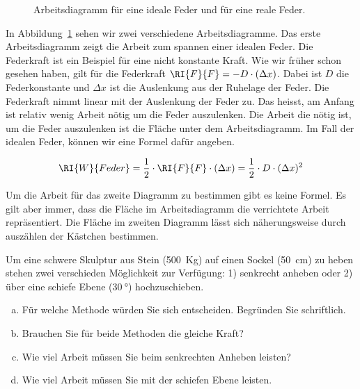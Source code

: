 \documentclass[12pt,a4paper,twoside]{article}
\def\dir{./Aufgaben_Mechanik/}
\newcommand{\Einbinden}[1]{}
\begin{document}
\begin{figure}[h!]
\begin{center}

\end{center}
\caption{\label{fig:arbeitsdiagramm} Arbeitsdiagramm für eine ideale Feder und für eine reale Feder.
}
\end{figure}

In Abbildung~\ref{fig:arbeitsdiagramm} sehen wir zwei verschiedene Arbeitsdiagramme. 
Das erste Arbeitsdiagramm zeigt die Arbeit zum spannen einer idealen Feder.
Die Federkraft ist ein Beispiel für eine nicht konstante Kraft. Wie wir früher schon
gesehen haben, gilt für die Federkraft $\RI{F}{F} = -D\cdot (\Delta x)$. Dabei ist $D$ die Federkonstante
und $\Delta x$ ist die Auslenkung aus der Ruhelage der Feder.
Die Federkraft nimmt linear mit der Auslenkung der Feder zu. Das heisst, am Anfang ist relativ wenig
Arbeit nötig um die Feder auszulenken. Die Arbeit die nötig ist, um die Feder auszulenken ist
die Fläche unter dem Arbeitsdiagramm. Im Fall der idealen Feder, können wir eine Formel dafür angeben.


\begin{eqnarray*}
	\RI{W}{Feder}= \frac{1}{2}\cdot\RI{F}{F}\cdot(\Delta x)=\frac{1}{2}\cdot D\cdot(\Delta x)^2
\end{eqnarray*}

Um die Arbeit für das zweite Diagramm zu bestimmen gibt es keine Formel. Es gilt aber immer, dass die Fläche
im Arbeitsdiagramm die verrichtete Arbeit repräsentiert. Die Fläche im zweiten Diagramm lässt sich näherungsweise
durch auszählen der Kästchen bestimmen.

%

\Einbinden{\dir/arbeit_feder01.tex}


\begin{aufgabe}
	Um eine schwere Skulptur aus Stein (\SI{500}{Kg}) auf einen Sockel (\SI{50}{cm}) zu heben stehen zwei verschieden Möglichkeit zur Verfügung:
	1) senkrecht anheben oder 2) über eine schiefe Ebene ($\SI{30}{\degree}$) hochzuschieben.

	\begin{enumerate}[a)]
		\item Für welche Methode würden Sie sich entscheiden. Begründen Sie schriftlich.
		\item Brauchen Sie für beide Methoden die gleiche Kraft?
		\item Wie viel Arbeit müssen Sie beim senkrechten Anheben leisten?
		\item Wie viel Arbeit müssen Sie mit der schiefen Ebene leisten.
	\end{enumerate}
\end{aufgabe}
\end{document}
